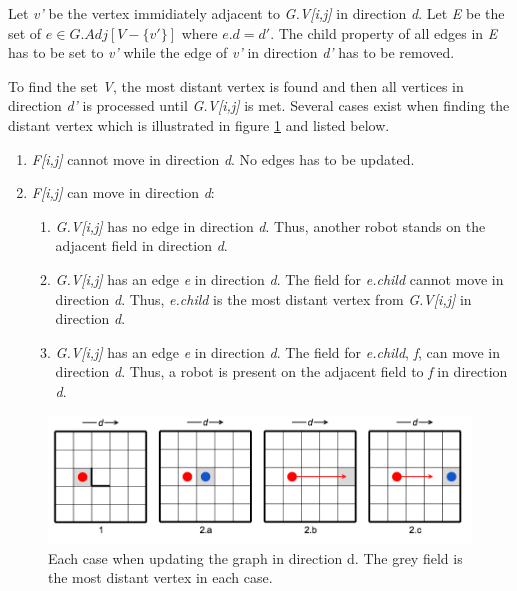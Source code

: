 \documentclass[]{article}
\providecommand{\tightlist}{%
  \setlength{\itemsep}{0pt}\setlength{\parskip}{0pt}}
\begin{document}
Let \emph{v'} be the vertex immidiately adjacent to \emph{G.V{[}i,j{]}}
in direction \emph{d}. Let \emph{E} be the set of
\(e \in G.Adj[V-\{v'\}]\) where \(e.d = d'\). The child property of all
edges in \emph{E} has to be set to \emph{v'} while the edge of \emph{v'}
in direction \emph{d'} has to be removed.

To find the set \emph{V}, the most distant vertex is found and then all
vertices in direction \emph{d'} is processed until \emph{G.V{[}i,j{]}}
is met. Several cases exist when finding the distant vertex which is
illustrated in figure \ref{fig:graph_states} and listed below.

\begin{enumerate}
\def\labelenumi{\arabic{enumi}.}
\tightlist
\item
  \emph{F{[}i,j{]}} cannot move in direction \emph{d}. No edges has to
  be updated.
\item
  \emph{F{[}i,j{]}} can move in direction \emph{d}:

  \begin{enumerate}
  \def\labelenumii{\alph{enumii}.}
  \tightlist
  \item
    \emph{G.V{[}i,j{]}} has no edge in direction \emph{d}. Thus, another
    robot stands on the adjacent field in direction \emph{d}.
  \item
    \emph{G.V{[}i,j{]}} has an edge \emph{e} in direction \emph{d}. The
    field for \emph{e.child} cannot move in direction \emph{d}. Thus,
    \emph{e.child} is the most distant vertex from \emph{G.V{[}i,j{]}}
    in direction \emph{d}.
  \item
    \emph{G.V{[}i,j{]}} has an edge \emph{e} in direction \emph{d}. The
    field for \emph{e.child}, \emph{f}, can move in direction \emph{d}.
    Thus, a robot is present on the adjacent field to \emph{f} in
    direction \emph{d}.
  \end{enumerate}
\end{enumerate}

\begin{figure}[htb]
\centering
\includegraphics[width=1\linewidth]{img/graph_states.png}
\caption{Each case when updating the graph in direction d. The grey field is the most distant vertex in each case.}
\label{fig:graph_states}
\end{figure}
\end{document}
